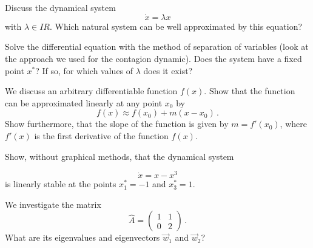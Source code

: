  \exercise[topic=Linear Stability
 ]
  \subexercise
  
  
  Discuss the dynamical system
  \begin{equation}
      \dot x = \lambda x
  \end{equation}
  with $\lambda\in I\!\!R$. Which natural system can be well approximated by this equation?

Solve the differential equation with the method of separation of variables (look at the approach we used for the contagion dynamic). Does the system have a fixed point $x^*$? If so, for which values of   $\lambda$ does it exist?

  \subexercise
  
  We discuss an arbitrary differentiable function $f(x)$. Show that the function can be approximated linearly at any point $x_0$ by 
    \begin{equation}
      f(x) \approx f(x_0) + m(x-x_0)\,.
  \end{equation}
  Show furthermore, that the slope of the function is given by $m=f'(x_0)$, where $f'(x)$ is the first derivative of the function $f(x)$. 

  \subexercise
  
  Show, without graphical methods, that the dynamical system 
  
  \begin{equation}
      \dot x = x-x^3
  \end{equation}
is linearly stable at the points $x^*_1=-1$ and $x^*_3=1$.

  \exercise[topic=Eigenwerte und Eigenvektoren]
  \subexercise
We investigate the matrix
  \begin{equation}
      \hat A = \begin{pmatrix} 1 & 1 \\ 0 & 2\end{pmatrix}\,.
  \end{equation}
What are its eigenvalues and eigenvectors $\vec w_1$ and
  $\vec w_2$?
  

